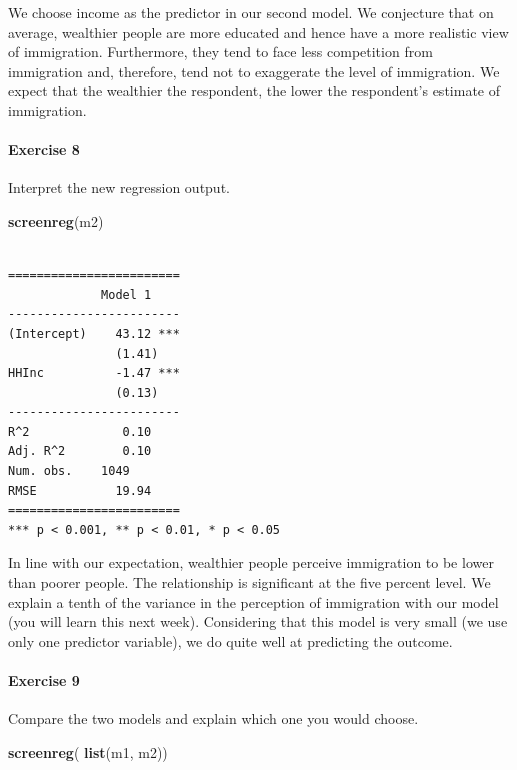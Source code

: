 \documentclass[]{article}
\newenvironment{Shaded}{\begin{snugshade}}{\end{snugshade}}
\newcommand{\KeywordTok}[1]{\textcolor[rgb]{0.13,0.29,0.53}{\textbf{#1}}}
\newcommand{\NormalTok}[1]{#1}
\let\oldparagraph\paragraph
\renewcommand{\paragraph}[1]{\oldparagraph{#1}\mbox{}}
\theoremstyle{definition}
\theoremstyle{definition}
\theoremstyle{definition}
\theoremstyle{remark}
\begin{document}
We choose income as the predictor in our second model. We conjecture
that on average, wealthier people are more educated and hence have a
more realistic view of immigration. Furthermore, they tend to face less
competition from immigration and, therefore, tend not to exaggerate the
level of immigration. We expect that the wealthier the respondent, the
lower the respondent's estimate of immigration.

\paragraph{Exercise 8}\label{exercise-8-5}

Interpret the new regression output.

\begin{Shaded}
\begin{Highlighting}[]
\KeywordTok{screenreg}\NormalTok{(m2)}
\end{Highlighting}
\end{Shaded}

\begin{verbatim}

========================
             Model 1    
------------------------
(Intercept)    43.12 ***
               (1.41)   
HHInc          -1.47 ***
               (0.13)   
------------------------
R^2             0.10    
Adj. R^2        0.10    
Num. obs.    1049       
RMSE           19.94    
========================
*** p < 0.001, ** p < 0.01, * p < 0.05
\end{verbatim}

In line with our expectation, wealthier people perceive immigration to
be lower than poorer people. The relationship is significant at the five
percent level. We explain a tenth of the variance in the perception of
immigration with our model (you will learn this next week). Considering
that this model is very small (we use only one predictor variable), we
do quite well at predicting the outcome.

\paragraph{Exercise 9}\label{exercise-9-4}

Compare the two models and explain which one you would choose.

\begin{Shaded}
\begin{Highlighting}[]
\KeywordTok{screenreg}\NormalTok{( }\KeywordTok{list}\NormalTok{(m1, m2))}
\end{Highlighting}
\end{Shaded}
\end{document}
